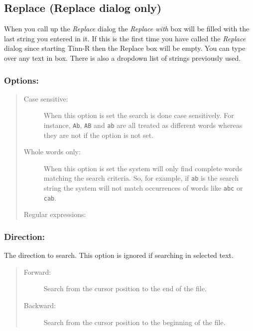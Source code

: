 \subsection{Replace (Replace dialog only)}

When you call up the \textit{Replace} dialog
the \textit{Replace with} box
will be filled with the last string you entered in it. If this is the first
time you have called the \textit{Replace} dialog since starting Tinn-R then
the Replace box will be empty. You can type over any text in box. There is
also a dropdown list of strings previously used.


\subsubsection{Options:}

\begin{quote}
  \begin{footnotesize}
    \begin{description}
      \item[Case sensitive:]
        When this option is set the search is done case sensitively. For instance,
        \texttt{Ab}, \texttt{AB} and \texttt{ab} are all treated as different words
        whereas they are not if the option is not set.
      \item[Whole words only:]
        When this option is set the system will only find complete words matching
        the search criteria. So, for example, if \texttt{ab} is the search string
        the system will not match occurrences of words like \texttt{abc} or
        \texttt{cab}.
      \item[Regular expressions:]
    \end{description}
  \end{footnotesize}
\end{quote}


\subsubsection{Direction:}

The direction to search. This option is ignored if searching in selected text.

\begin{quote}
  \begin{footnotesize}
    \begin{description}
      \item[Forward:]
        Search from the cursor position to the end of the file.
      \item[Backward:]
        Search from the cursor position to the beginning of the file.
    \end{description}
  \end{footnotesize}
\end{quote}


